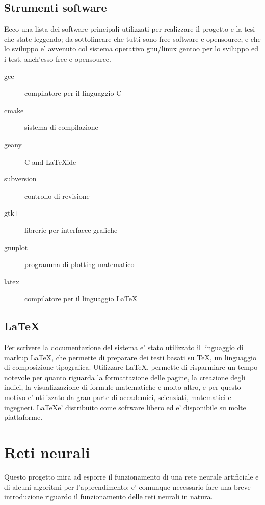 \documentclass[a4paper,10pt]{book}
\begin{document}
\section{Strumenti software}
Ecco una lista dei software principali utilizzati per realizzare il progetto e la tesi
che state leggendo; da sottolineare che tutti sono free software e opensource, e che 
lo sviluppo e' avvenuto col sistema operativo gnu/linux gentoo per lo sviluppo ed i test, 
anch'esso free e opensource.

\begin{description}
\item[gcc] compilatore per il linguaggio C
\item[cmake] sistema di compilazione
\item[geany] C and \LaTeX ide
\item[subversion] controllo di revisione
\item[gtk+] librerie per interfacce grafiche
\item[gnuplot] programma di plotting matematico
\item[latex] compilatore per il linguaggio \LaTeX
\end{description}



\section{\LaTeX}
Per scrivere la documentazione del sistema e' stato utilizzato il linguaggio di markup
\LaTeX, che permette di preparare dei testi basati su \TeX, un linguaggio di composizione 
tipografica. Utilizzare \LaTeX, permette di risparmiare un tempo notevole per quanto riguarda
la formattazione delle pagine, la creazione degli indici, la visualizzazione di formule matematiche
e molto altro, e per questo motivo e' utilizzato da gran parte di accademici, scienziati, matematici
e ingegneri. \LaTeX e' distribuito come software libero ed e' disponibile su molte piattaforme.





\chapter{Reti neurali}
Questo progetto mira ad esporre il funzionamento di una rete neurale artificiale
e di alcuni algoritmi per l'apprendimento; e' comunque necessario fare una breve
introduzione riguardo il funzionamento delle reti neurali in natura.
\end{document}
